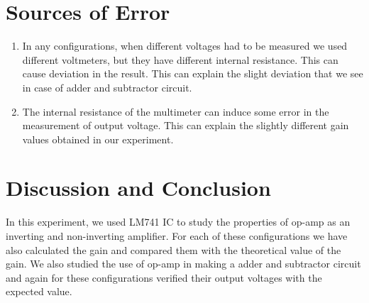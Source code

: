 \documentclass[12pt]{article}
\begin{document}
\section{Sources of Error}
\begin{enumerate}
	\item In any configurations, when different voltages had to be measured we used different voltmeters, but they have different internal resistance. This can cause deviation in the result. This can explain the slight deviation that we see in case of adder and subtractor circuit.
	\item The internal resistance of the multimeter can  induce some error in the measurement of output voltage. This can explain the slightly different gain values obtained in our experiment.
\end{enumerate}
\section{Discussion and Conclusion}
In this experiment, we used LM741 IC to study the properties of op-amp as an inverting and non-inverting amplifier. For each of these configurations we have also calculated the gain and compared them with the theoretical value of the gain. We also studied the use of op-amp in making a adder and subtractor circuit and again for these configurations verified their output voltages with the expected value.
\end{document}
